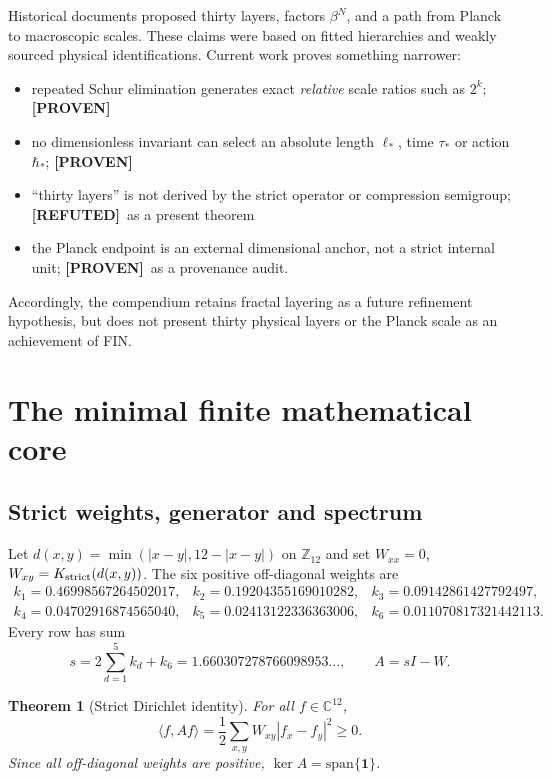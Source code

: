 \documentclass[11pt,a4paper]{article}
\newtheorem{theorem}{Theorem}[section]
\theoremstyle{definition}
\theoremstyle{remark}
\newcommand{\C}{\mathbb C}
\newcommand{\Z}{\mathbb Z}
\newcommand{\one}{\bm 1}
\newcommand{\status}[2]{\textcolor{#1}{\textbf{[#2]}}}
\newcommand{\proven}{\status{fingreen}{PROVEN}}
\newcommand{\refuted}{\status{finred}{REFUTED}}
\begin{document}
Historical documents proposed thirty layers, factors $\beta^N$, and a path from Planck to macroscopic scales. These claims were based on fitted hierarchies and weakly sourced physical identifications. Current work proves something narrower:

\begin{itemize}
\item repeated Schur elimination generates exact \emph{relative} scale ratios such as $2^k$; \proven
\item no dimensionless invariant can select an absolute length $\ell_*$, time $\tau_*$ or action $\hbar_*$; \proven
\item ``thirty layers'' is not derived by the strict operator or compression semigroup; \refuted\ as a present theorem
\item the Planck endpoint is an external dimensional anchor, not a strict internal unit; \proven\ as a provenance audit.
\end{itemize}

Accordingly, the compendium retains fractal layering as a future refinement hypothesis, but does not present thirty physical layers or the Planck scale as an achievement of FIN.

\section{The minimal finite mathematical core}

\subsection{Strict weights, generator and spectrum}

Let $d(x,y)=\min(|x-y|,12-|x-y|)$ on $\Z_{12}$ and set $W_{xx}=0$, $W_{xy}=K_{\rm strict}(d(x,y))$. The six positive off-diagonal weights are
\[
\begin{array}{lll}
k_1=0.46998567264502017,&k_2=0.19204355169010282,&k_3=0.09142861427792497,\\
k_4=0.04702916874565040,&k_5=0.02413122336363006,&k_6=0.011070817321442113.
\end{array}
\]
Every row has sum
\[
s=2\sum_{d=1}^{5}k_d+k_6=1.660307278766098953\ldots,
\qquad A=sI-W.
\]

\begin{theorem}[Strict Dirichlet identity]
For all $f\in\C^{12}$,
\[
\langle f,Af\rangle=\frac12\sum_{x,y}W_{xy}|f_x-f_y|^2\ge0.
\]
Since all off-diagonal weights are positive, $\ker A=\mathrm{span}\{\one\}$.
\end{theorem}
\end{document}
